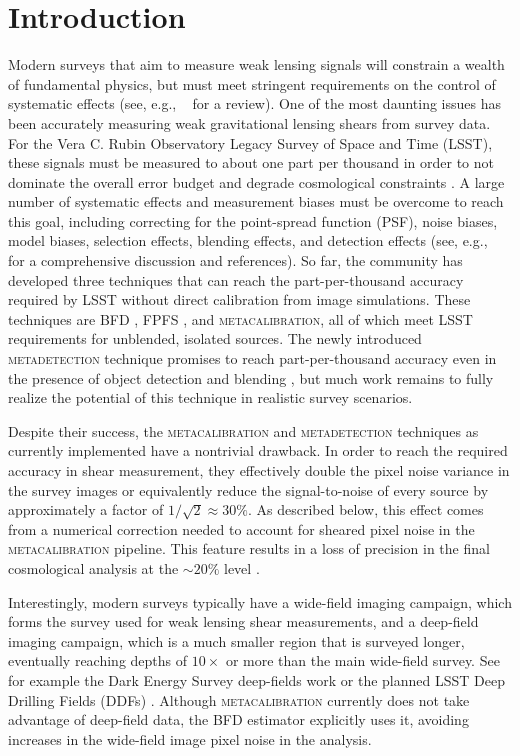 \documentclass[twocolumn]{openjournal}
\makeatletter
\newcommand{\mdet}{\textsc{metadetection}\@\xspace}
\newcommand{\mcal}{\textsc{metacalibration}\@\xspace}
\makeatother
\begin{document}
\section{Introduction}\label{sec:intro}

Modern surveys that aim to measure weak lensing signals will constrain a wealth of
fundamental physics, but must meet stringent requirements on the control of systematic
effects (see, e.g., \citeauthor{MandelbaumReview}~\citeyear{MandelbaumReview} for a
review). One of the most daunting issues has been accurately measuring weak
gravitational lensing shears from survey data. For the Vera C. Rubin Observatory Legacy
Survey of Space and Time (LSST), these signals must be measured to about one part per
thousand in order to not dominate the overall error budget and degrade cosmological
constraints \citep{huterer2006,descsrd}. A large number of systematic effects and
measurement biases must be overcome to reach this goal, including correcting for the
point-spread function (PSF), noise biases, model biases, selection effects, blending
effects, and detection effects (see, e.g.,
\citeauthor{MandelbaumReview}~\citeyear{MandelbaumReview} for a comprehensive discussion
and references). So far, the community has developed three techniques
that can reach the part-per-thousand accuracy required by LSST without direct
calibration from image simulations. These techniques are BFD \citep{BernBFD2016,ba14},
FPFS \citep{li2018fpfs,li2022fpfs}, and \mcal \citep{SheldonMcal2017,HuffMcal2017},
all of which meet LSST requirements for unblended, isolated sources. The newly
introduced \mdet technique promises to reach part-per-thousand accuracy even in the
presence of object detection and blending \citep{SheldonMdet2022}, but much work
remains to fully realize the potential of this technique in realistic survey scenarios.

Despite their success, the \mcal and \mdet techniques as currently implemented
have a nontrivial drawback. In order to reach the required accuracy in shear
measurement, they effectively double the pixel noise variance in the survey
images or equivalently reduce the signal-to-noise of every source by
approximately a factor of $1/\sqrt{2}\approx30\%$. As described below, this
effect comes from a numerical correction needed to account for sheared pixel
noise in the \mcal pipeline. This feature results in a loss of precision in the
final cosmological analysis at the $\sim 20\%$ level \citep{SheldonMcal2017}.

Interestingly, modern surveys typically have a wide-field imaging campaign, which forms
the survey used for weak lensing shear measurements, and a deep-field imaging campaign,
which is a much smaller region that is surveyed longer, eventually reaching depths of
$10\times$ or more than the main wide-field survey. See for example the Dark Energy
Survey deep-fields work \citep{DESDeepFields} or the planned LSST Deep Drilling Fields
(DDFs) \citep{lsst-ddf-design,lsst-ddf-depth,ivezic2019lsst}. Although \mcal currently
does not take advantage of deep-field data, the BFD estimator explicitly uses it,
avoiding increases in the wide-field image pixel noise in the analysis.
\end{document}
